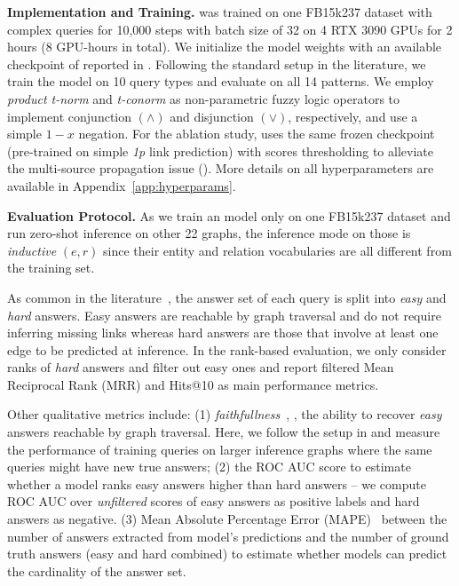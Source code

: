 \textbf{Implementation and Training.}
\method was trained on one FB15k237 dataset with complex queries for 10,000 steps with batch size of 32 on 4 RTX 3090 GPUs for 2 hours (8 GPU-hours in total). 
We initialize the model weights with an available checkpoint of \ultra reported in \citet{ultra}. 
Following the standard setup in the literature, we train the model on 10 query types and evaluate on all 14 patterns.
We employ \emph{product t-norm} and \emph{t-conorm} as non-parametric fuzzy logic operators to implement conjunction $(\wedge)$ and disjunction $(\lor)$, respectively, and use a simple $1-x$ negation.
For the ablation study, \methodlp uses the same frozen checkpoint (pre-trained on simple \emph{1p} link prediction) with scores thresholding to alleviate the multi-source propagation issue ().
More details on all hyperparameters are available in Appendix~\ref{app:hyperparams}.



\textbf{Evaluation Protocol.}
As we train an \method model only on one FB15k237 dataset and run zero-shot inference on other 22 graphs, the inference mode on those is \emph{inductive} $(e,r)$ since their entity and relation vocabularies are all different from the training set.

As common in the literature~\citep{betae,ren2023ngdb}, the answer set of each query is split into \emph{easy} and \emph{hard} answers. 
Easy answers are reachable by graph traversal and do not require inferring missing links whereas hard answers are those that involve at least one edge to be predicted at inference.
In the rank-based evaluation, we only consider ranks of \emph{hard} answers and filter out easy ones and report filtered Mean Reciprocal Rank (MRR) and Hits@10 as main performance metrics.

Other qualitative metrics include: (1) \emph{faithfullness}~\citep{emql}, \ie, the ability to recover \emph{easy} answers reachable by graph traversal. 
Here, we follow the setup in \citet{galkin2022} and measure the performance of training queries on larger inference graphs where the same queries might have new true answers;
(2) the ROC AUC score to estimate whether a model ranks easy answers higher than hard answers -- we compute ROC AUC over \emph{unfiltered} scores of easy answers as positive labels and hard answers as negative.
(3) Mean Absolute Percentage Error (MAPE)~\citep{gnn_qe} between the number of answers extracted from model's predictions and the number of ground truth answers (easy and hard combined) to estimate whether \clqa models can predict the cardinality of the answer set.



